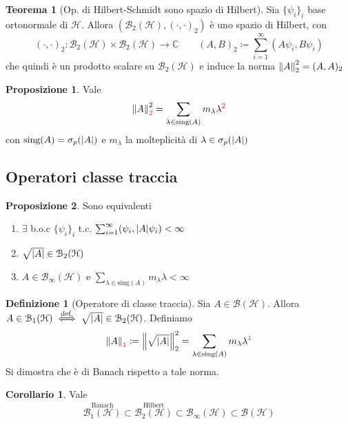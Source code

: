 \documentclass[a4paper,10pt]{article}
\theoremstyle{definition}
\newcommand{\im}{\mathbb{C}} %
\newcommand{\hil}{\mathcal{H}} %
\theoremstyle{indentdefinition}
\newtheorem{defn}{Definizione}[section]
\theoremstyle{indenttheorem}
\newtheorem{thm}{Teorema}
\newtheorem{prop}{Proposizione}
\newtheorem{cor}{Corollario}
\theoremstyle{myremark}
\theoremstyle{indentgeneral}
\begin{document}
\begin{thm}[Op. di Hilbert-Schmidt sono spazio di Hilbert] \label{thm-B2-spazio-hilbert}
    Sia $\{\psi_i\}_i$ base ortonormale di $\hil$. Allora $(\mathcal{B}_2(\hil),(\cdot,\cdot)_2)$ è uno spazio di Hilbert, con 
$$(\cdot,\cdot)_2:\mathcal{B}_2(\hil)\times\mathcal{B}_2(\hil)\to\im\qquad (A,B)_2\coloneqq\sum_{i=1}^\infty(A\psi_i,B\psi_i)$$
    che quindi è un prodotto scalare su $\mathcal{B}_2(\hil)$ e induce la norma $\norm{A}_2^2=(A,A)_2$
\end{thm}

\begin{prop}
    Vale
    $$\norm{A}_{\textcolor{red}{2}}^2=\sum_{\lambda\in\text{sing}(A)}m_\lambda\lambda^{\textcolor{red}{2}}$$
    con $\text{sing}(A)=\sigma_p(\abs{A})$ e $m_\lambda$ la molteplicità di $\lambda\in\sigma_p(\abs{A})$
\end{prop}

\subsection{Operatori classe traccia}
\begin{prop}
    Sono equivalenti

\begin{enumerate}
    \item $\exists$ b.o.c $\{\psi_i\}_i$ t.c. $\sum_{i=1}^\infty(\psi_i,\abs{A}\psi_i)<\infty$
    \item $\sqrt{\abs{A}}\in\mathcal{B}_2(\hil)$
    \item $A\in\mathcal{B}_\infty(\hil)$ e $\sum_{\lambda\in\text{sing}(A)}m_\lambda\lambda<\infty$
\end{enumerate}
\end{prop}

\begin{defn}[Operatore di classe traccia]
    Sia $A\in\mathcal{B}(\hil)$. Allora $A\in \mathcal{B}_1(\hil)\overset{\text{def.}}{\iff}\sqrt{\abs{A}}\in\mathcal{B}_2(\hil)$. Definiamo
    $$\norm{A}_{\textcolor{red}{1}}\coloneqq\norm{\sqrt{\abs{A}}}_2^2=\sum_{\lambda\in\text{sing}(A)}m_\lambda\lambda^{\textcolor{red}{1}}$$
    Si dimostra che è di Banach rispetto a tale norma.
\end{defn}

\begin{cor}
    Vale
    $$\overset{\text{Banach}}{\mathcal{B}_1(\hil)}\subset\overset{\text{Hilbert}}{\mathcal{B}_2(\hil)}\subset\mathcal{B}_\infty(\hil)\subset\mathcal{B}(\hil)$$
\end{cor}
\end{document}
